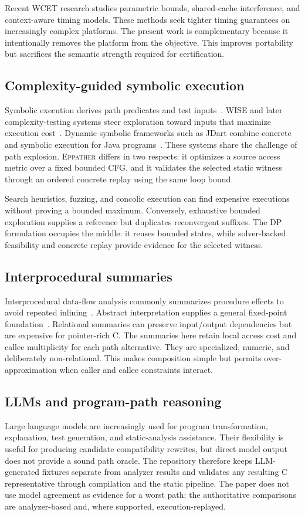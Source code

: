 \documentclass[10pt,conference]{IEEEtran}
\newcommand{\tool}{\textsc{Eppather}\xspace}
\begin{document}
Recent WCET research studies parametric bounds, shared-cache interference, and context-aware timing models. These methods seek tighter timing guarantees on increasingly complex platforms. The present work is complementary because it intentionally removes the platform from the objective. This improves portability but sacrifices the semantic strength required for certification.

\subsection{Complexity-guided symbolic execution}
Symbolic execution derives path predicates and test inputs~\cite{king1976symbolic,baldoni2018survey}. WISE and later complexity-testing systems steer exploration toward inputs that maximize execution cost~\cite{burnim2009wcec}. Dynamic symbolic frameworks such as JDart combine concrete and symbolic execution for Java programs~\cite{luckow2017jdart}. These systems share the challenge of path explosion. \tool differs in two respects: it optimizes a source access metric over a fixed bounded CFG, and it validates the selected static witness through an ordered concrete replay using the same loop bound.

Search heuristics, fuzzing, and concolic execution can find expensive executions without proving a bounded maximum. Conversely, exhaustive bounded exploration supplies a reference but duplicates reconvergent suffixes. The DP formulation occupies the middle: it reuses bounded states, while solver-backed feasibility and concrete replay provide evidence for the selected witness.

\subsection{Interprocedural summaries}
Interprocedural data-flow analysis commonly summarizes procedure effects to avoid repeated inlining~\cite{sharir1978interprocedural}. Abstract interpretation supplies a general fixed-point foundation~\cite{cousot1977abstract}. Relational summaries can preserve input/output dependencies but are expensive for pointer-rich C. The summaries here retain local access cost and callee multiplicity for each path alternative. They are specialized, numeric, and deliberately non-relational. This makes composition simple but permits over-approximation when caller and callee constraints interact.

\subsection{LLMs and program-path reasoning}
Large language models are increasingly used for program transformation, explanation, test generation, and static-analysis assistance. Their flexibility is useful for producing candidate compatibility rewrites, but direct model output does not provide a sound path oracle. The repository therefore keeps LLM-generated fixtures separate from analyzer results and validates any resulting C representative through compilation and the static pipeline. The paper does not use model agreement as evidence for a worst path; the authoritative comparisons are analyzer-based and, where supported, execution-replayed.
\end{document}
